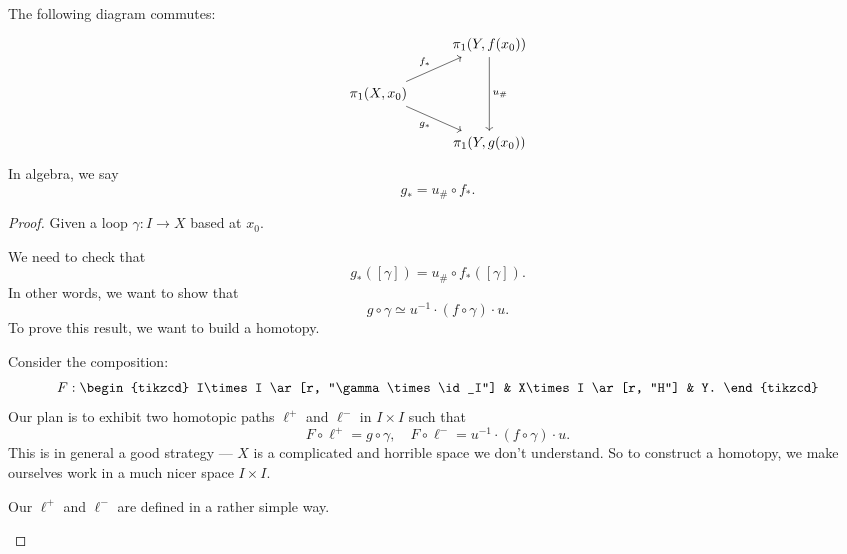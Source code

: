 \documentclass[a4paper]{article}
\begin{document}
\begin{lemma}
  The following diagram commutes:
  \[
    \begin{tikzcd}
      & \pi_1(Y, f(x_0)) \ar[dd, "u_\#"]\\
      \pi_1(X, x_0) \ar[ru, "f_*"] \ar [rd, "g_*"']& \\
      & \pi_1(Y, g(x_0))
    \end{tikzcd}
  \]
  In algebra, we say
  \[
    g_* = u_\# \circ f_*.
  \]
\end{lemma}

\begin{proof}
  Given a loop $\gamma: I\to X$ based at $x_0$.

  We need to check that
  \[
    g_*([\gamma]) = u_\#\circ f_*([\gamma]).
  \]
  In other words, we want to show that
  \[
    g\circ \gamma \simeq u^{-1}\cdot (f\circ \gamma)\cdot u.
  \]
  To prove this result, we want to build a homotopy.

  Consider the composition:
  \[
    F:
    \begin{tikzcd}
      I\times I \ar[r, "\gamma\times \id_I"] & X\times I \ar[r, "H"] & Y.
    \end{tikzcd}
  \]
  Our plan is to exhibit two homotopic paths $\ell^+$ and $\ell^-$ in $I\times I$ such that
  \[
    F\circ \ell^+ = g \circ \gamma,\quad F\circ \ell^- = u^{-1}\cdot (f\circ \gamma) \cdot u.
  \]
  This is in general a good strategy --- $X$ is a complicated and horrible space we don't understand. So to construct a homotopy, we make ourselves work in a much nicer space $I\times I$.

  Our $\ell^+$ and $\ell^-$ are defined in a rather simple way.
  \begin{center}
\end{center}
\end{proof}
\end{document}

